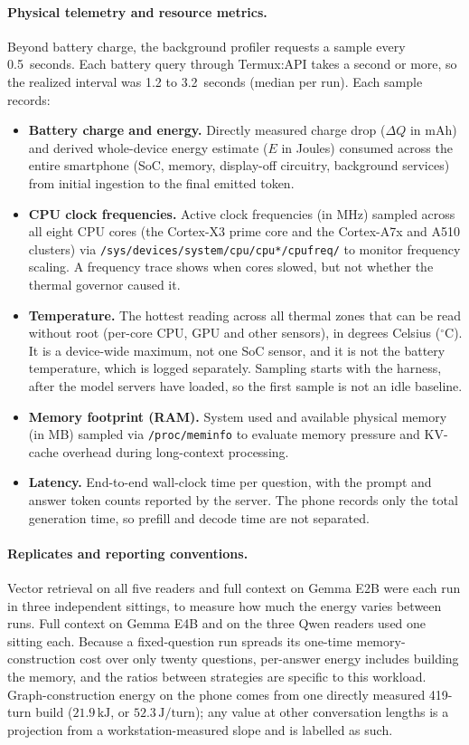\paragraph{Physical telemetry and resource metrics.} Beyond battery charge, the background profiler
requests a sample every 0.5~seconds. Each battery query through Termux:API takes a second or more,
so the realized interval was 1.2 to 3.2~seconds (median per run). Each sample records:
\begin{itemize}
  \item \textbf{Battery charge and energy.} Directly measured charge drop ($\Delta Q$ in $\text{mAh}$)
        and derived whole-device energy estimate ($E$ in Joules) consumed across the entire smartphone
        (SoC, memory, display-off circuitry, background services) from initial ingestion to the final
        emitted token.
  \item \textbf{CPU clock frequencies.} Active clock frequencies (in MHz) sampled across
        all eight CPU cores (the Cortex-X3 prime core and the Cortex-A7x and A510 clusters) via
        \texttt{/sys/devices/system/cpu/cpu*/cpufreq/} to monitor frequency scaling. A frequency
        trace shows when cores slowed, but not whether the thermal governor caused it.
  \item \textbf{Temperature.} The hottest reading across all thermal zones that can be read without
        root (per-core CPU, GPU and other sensors), in degrees Celsius ($^\circ\text{C}$). It is a
        device-wide maximum, not one SoC sensor, and it is not the battery temperature, which
        is logged separately. Sampling starts with the harness, after the model servers have loaded,
        so the first sample is not an idle baseline.
  \item \textbf{Memory footprint (RAM).} System used and available physical memory (in MB) sampled via
        \texttt{/proc/meminfo} to evaluate memory pressure and KV-cache overhead during long-context
        processing.
  \item \textbf{Latency.} End-to-end wall-clock time per question, with the prompt and answer token
        counts reported by the server. The phone records only the total generation time, so prefill
        and decode time are not separated.
\end{itemize}

\paragraph{Replicates and reporting conventions.} Vector retrieval on all five readers and full
context on Gemma E2B were each run in three independent sittings, to measure how
much the energy varies between runs. Full context on Gemma E4B and on the three Qwen readers used
one sitting each. Because a fixed-question run spreads its one-time memory-construction cost over
only twenty questions, per-answer energy includes building the memory, and the ratios between
strategies are specific to this workload. Graph-construction energy on the phone comes from one
directly measured 419-turn build ($21.9\,\text{kJ}$, or $52.3\,\text{J/turn}$); any value at other
conversation lengths is a projection from a workstation-measured slope and is labelled as such.

